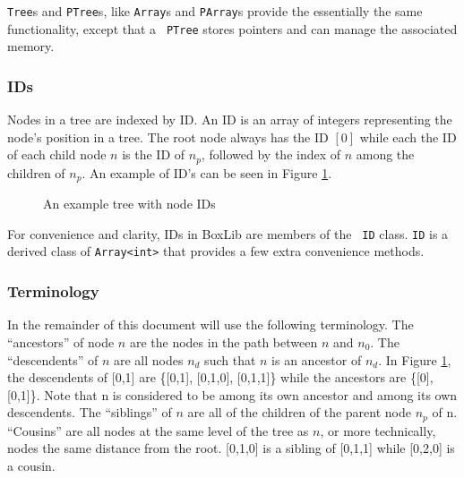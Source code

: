 \documentclass[11pt]{article}
\begin{document}
{\tt Tree}s and {\tt PTree}s, like {\tt Array}s and {\tt PArray}s 
provide the essentially the same functionality, except that a {\tt 
PTree} stores pointers and can manage the associated memory.

\subsubsection{IDs}
Nodes in a tree are indexed by ID. An ID is an array of integers 
representing the node's position in a tree. The root node always has 
the ID $[0]$ while each the ID of each child node $n$ is the ID of 
$n_p$, followed by the index of $n$ among the children of $n_p$. An 
example of ID's can be seen in Figure \ref{id-example}.

\begin{figure}
\center
{}
\caption{An example tree with node IDs}
\label{id-example}
\end{figure}

For convenience and clarity, IDs in BoxLib are members of the {\tt 
ID} class. {\tt ID} is a derived class of {\tt Array<int>} 
that provides a few extra convenience methods. 

\subsubsection{Terminology}

In the remainder of this document will use the following 
terminology. The ``ancestors'' of node $n$ are the nodes in the path 
between $n$ and $n_0$. The ``descendents'' of $n$ are all nodes $n_d$
such that $n$ is an ancestor of $n_d$. In Figure \ref{id-example}, 
the descendents of [0,1] are \{[0,1], [0,1,0], [0,1,1]\} while the 
ancestors are \{[0], [0,1]\}. Note that n is considered to be among 
its own ancestor and among its own descendents. The ``siblings'' of 
$n$ are all of the children of the parent node $n_p$ of n. 
``Cousins'' are all nodes at the same level of the tree as $n$, or 
more technically, nodes the same distance from the root. [0,1,0] is a 
sibling of [0,1,1] while [0,2,0] is a cousin.
\end{document}
